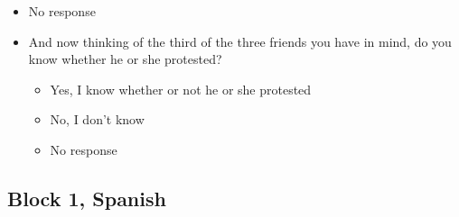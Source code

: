 \documentclass[12pt]{article}
\begin{document}
\begin{enumerate}
\begin{itemize}
\begin{itemize}
\item No response
\end{itemize}
\end{itemize}
\begin{itemize}
\item And now thinking of the third of the three friends you have in mind, do you know whether he or she protested?
\begin{itemize}
\item Yes, I know whether or not he or she protested
\item No, I don't know
\item No response
\end{itemize}
\end{itemize}
\end{enumerate}

\subsection{Block 1, Spanish}
\end{document}
